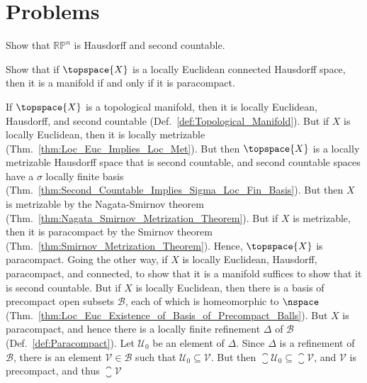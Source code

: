 \documentclass{article}                                                        %
\begin{document}
    \section{Problems}
        \begin{problem}
            Show that $\mathbb{RP}^{n}$ is Hausdorff and second countable.
        \end{problem}
        \begin{problem}
            Show that if $\topspace{X}$ is a locally Euclidean connected
            Hausdorff space, then it is a manifold if and only if it is
            paracompact.
        \end{problem}
        \begin{solution}
            If $\topspace{X}$ is a topological manifold, then it is locally
            Euclidean, Hausdorff, and second countable
            (Def.~\ref{def:Topological_Manifold}). But if $X$ is locally
            Euclidean, then it is locally metrizable
            (Thm.~\ref{thm:Loc_Euc_Implies_Loc_Met}). But then
            $\topspace{X}$ is a locally metrizable Hausdorff space that is
            second countable, and second countable spaces have a $\sigma$
            locally finite basis
            (Thm.~\ref{thm:Second_Countable_Implies_Sigma_Loc_Fin_Basis}).
            But then $X$ is metrizable by the Nagata-Smirnov theorem
            (Thm.~\ref{thm:Nagata_Smirnov_Metrization_Theorem}). But if
            $X$ is metrizable, then it is paracompact by the
            Smirnov theorem (Thm.~\ref{thm:Smirnov_Metrization_Theorem}). Hence,
            $\topspace{X}$ is paracompact. Going the other way, if $X$ is
            locally Euclidean, Hausdorff, paracompact, and connected, to show
            that it is a manifold suffices to show that it is second countable.
            But if $X$ is locally Euclidean, then there is a basis of
            precompact open subsets $\mathcal{B}$, each of which is homeomorphic
            to $\nspace$
            (Thm.~\ref{thm:Loc_Euc_Existence_of_Basis_of_Precompact_Balls}). But
            $X$ is paracompact, and hence there is a locally finite refinement
            $\Delta$ of $\mathcal{B}$ (Def.~\ref{def:Paracompact}). Let
            $\mathcal{U}_{0}$ be an element of $\Delta$. Since $\Delta$ is a
            refinement of $\mathcal{B}$, there is an element
            $\mathcal{V}\in\mathcal{B}$ such that
            $\mathcal{U}_{0}\subseteq\mathcal{V}$. But then
            $\closure{\mathcal{U}_{0}}\subseteq\closure{\mathcal{V}}$, and
            $\mathcal{V}$ is precompact, and thus $\closure{\mathcal{V}}$

\end{solution}
\end{document}
